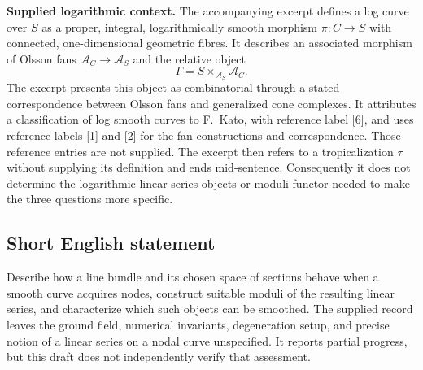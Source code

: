 \documentclass[11pt]{article}
\begin{document}
\textbf{Supplied logarithmic context.} The accompanying excerpt defines a log curve over \(S\) as a proper, integral, logarithmically smooth morphism \(\pi\colon C\to S\) with connected, one-dimensional geometric fibres. It describes an associated morphism of Olsson fans \(\mathcal A_C\to\mathcal A_S\) and the relative object
\[
\Gamma=S\times_{\mathcal A_S}\mathcal A_C.
\]
The excerpt presents this object as combinatorial through a stated correspondence between Olsson fans and generalized cone complexes. It attributes a classification of log smooth curves to F.\ Kato, with reference label [6], and uses reference labels [1] and [2] for the fan constructions and correspondence. Those reference entries are not supplied. The excerpt then refers to a tropicalization \(\tau\) without supplying its definition and ends mid-sentence. Consequently it does not determine the logarithmic linear-series objects or moduli functor needed to make the three questions more specific.
\subsection{Short English statement}
Describe how a line bundle and its chosen space of sections behave when a smooth curve acquires nodes, construct suitable moduli of the resulting linear series, and characterize which such objects can be smoothed. The supplied record leaves the ground field, numerical invariants, degeneration setup, and precise notion of a linear series on a nodal curve unspecified. It reports partial progress, but this draft does not independently verify that assessment.
\end{document}
